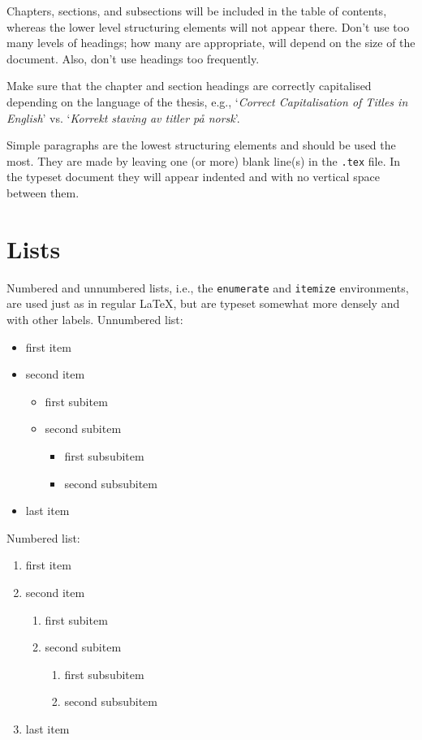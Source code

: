Chapters, sections, and subsections will be included in the table of contents, whereas the lower level structuring elements will not appear there. Don't use too many levels of headings; how many are appropriate, will depend on the size of the document. Also, don't use headings too frequently.

Make sure that the chapter and section headings are correctly capitalised depending on the language of the thesis, e.g., `\emph{Correct Capitalisation of Titles in English}' vs. `\emph{Korrekt staving av titler på norsk}'.

Simple paragraphs are the lowest structuring elements and should be used the most. They are made by leaving one (or more) blank line(s) in the \texttt{.tex} file. In the typeset document they will appear indented and with no vertical space between them.

\section{Lists}

Numbered and unnumbered lists, i.e., the \texttt{enumerate} and \texttt{itemize} environments, are used just as in regular \LaTeX{}, but are typeset somewhat more densely and with other labels. Unnumbered list:
\begin{itemize}
    \item first item
    \item second item
    \begin{itemize}
        \item first subitem
        \item second subitem
        \begin{itemize}
            \item first subsubitem
            \item second subsubitem
        \end{itemize}
    \end{itemize}
    \item last item
\end{itemize}
Numbered list:
\begin{enumerate}
    \item first item
    \item second item
    \begin{enumerate}
        \item first subitem
        \item second subitem
        \begin{enumerate}
            \item first subsubitem
            \item second subsubitem
        \end{enumerate}
    \end{enumerate}
    \item last item
\end{enumerate}

